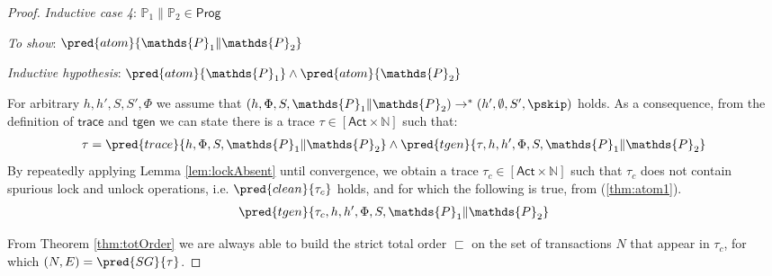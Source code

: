 {\begin{proof}
\textit{Inductive case 4}: $\mathds{P}_1 \| \mathds{P}_2 \in \mathsf{Prog}$

\textit{To show}: $\pred{atom}{\mathds{P}_1 \| \mathds{P}_2}$

\textit{Inductive hypothesis}: $\pred{atom}{\mathds{P}_1} \land \pred{atom}{\mathds{P}_2}$

For arbitrary $h, h', S, S', \Phi$ we assume that $(h, \Phi, S, \mathds{P}_1 \| \mathds{P}_2) \rightarrow^* (h', \emptyset, S', \pskip)$ holds. As a consequence, from the definition of $\mathsf{trace}$ and $\mathsf{tgen}$ we can state there is a trace $\tau \in [\mathsf{Act} \times \mathds{N}]$ such that:
\begin{gather}
	\label{thm:atom1} \tau = \pred{trace}{h, \Phi, S, \mathds{P}_1 \| \mathds{P}_2} \land \pred{tgen}{\tau, h, h', \Phi, S, \mathds{P}_1 \| \mathds{P}_2}
\end{gather}
By repeatedly applying Lemma \ref{lem:lockAbsent} until convergence, we obtain a trace $\tau_c \in [\mathsf{Act} \times \mathds{N}]$ such that $\tau_c$ does not contain spurious lock and unlock operations, i.e. $\pred{clean}{\tau_c}$ holds, and for which the following is true, from (\ref{thm:atom1}).
\begin{gather}
	\label{thm:atom2} \pred{tgen}{\tau_c, h, h', \Phi, S, \mathds{P}_1 \| \mathds{P}_2}
\end{gather}

From Theorem \ref{thm:totOrder} we are always able to build the strict total order $\sqsubset$ on the set of transactions $N$ that appear in $\tau_c$, for which $(N, E) = \pred{SG}{\tau}$.


\end{proof}}

